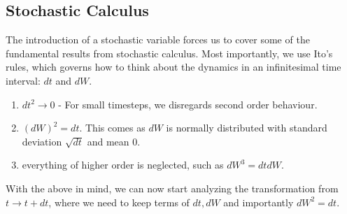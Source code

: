 \subsection{Stochastic Calculus}
The introduction of a stochastic variable forces us to cover some of the fundamental results from stochastic calculus. Most importantly, we use Ito's rules, which governs how to think about the dynamics in an infinitesimal time interval: $dt$ and $dW$.
\begin{enumerate}
    \item $dt^2 \to 0$ - For small timesteps, we disregards second order behaviour. 
    \item $(dW)^2 = dt$. This comes as $dW$ is normally distributed with standard deviation $\sqrt{dt}$ and mean $0$. 
    \item everything of higher order is neglected, such as $dW^3 = dt dW$.
\end{enumerate}
With the above in mind, we can now start analyzing the transformation from $t \to t + dt$, where we need to keep terms of $dt, dW$ and importantly $dW^2 = dt$.

